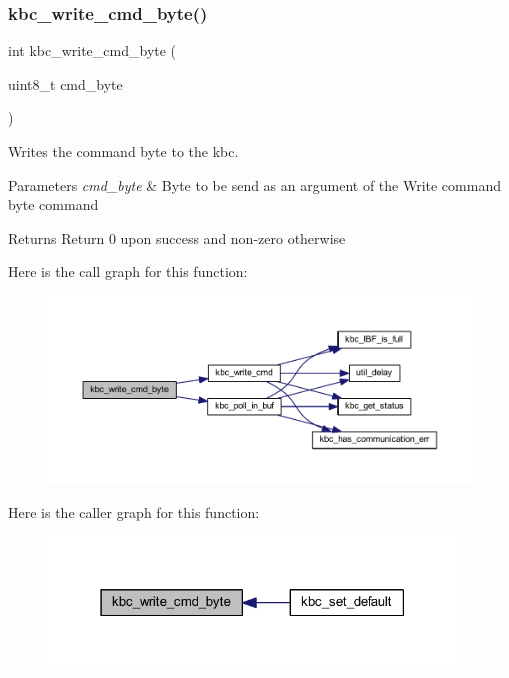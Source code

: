 \subsubsection{\texorpdfstring{kbc\+\_\+write\+\_\+cmd\+\_\+byte()}{kbc\_write\_cmd\_byte()}}
{\footnotesize\ttfamily int kbc\+\_\+write\+\_\+cmd\+\_\+byte (\begin{DoxyParamCaption}\item[{uint8\+\_\+t}]{cmd\+\_\+byte }\end{DoxyParamCaption})}



Writes the command byte to the kbc. 


\begin{DoxyParams}{Parameters}
{\em cmd\+\_\+byte} & Byte to be send as an argument of the Write command byte command \\
\hline
\end{DoxyParams}
\begin{DoxyReturn}{Returns}
Return 0 upon success and non-\/zero otherwise 
\end{DoxyReturn}
Here is the call graph for this function\+:\nopagebreak
\begin{figure}[H]
\begin{center}
\leavevmode
\includegraphics[width=350pt]{group__keyboard_gab18be1772193037a82088027884ef917_cgraph}
\end{center}
\end{figure}
Here is the caller graph for this function\+:\nopagebreak
\begin{figure}[H]
\begin{center}
\leavevmode
\includegraphics[width=307pt]{group__keyboard_gab18be1772193037a82088027884ef917_icgraph}
\end{center}
\end{figure}
\mbox{\label{group__keyboard_ga32e63cb280df583f193cbc065b0b327e}} 
